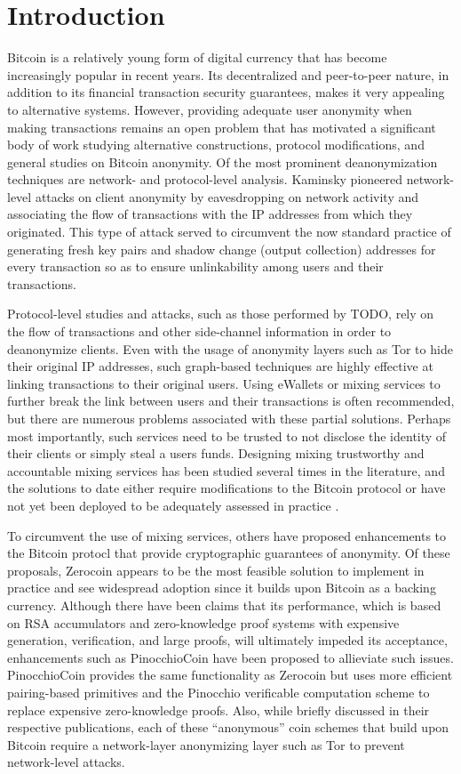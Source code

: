 \section{Introduction}
Bitcoin is a relatively young form of digital currency that has become increasingly popular in recent years. Its decentralized and peer-to-peer nature, in addition to its financial transaction security guarantees, makes it very appealing to alternative systems. However, providing adequate user anonymity when making transactions remains an open problem that has motivated a significant body of work studying alternative constructions, protocol modifications, and general studies on Bitcoin anonymity. Of the most prominent deanonymization techniques are network- and protocol-level analysis. Kaminsky \cite{kaminsky} pioneered network-level attacks on client anonymity by eavesdropping on network activity and associating the flow of transactions with the IP addresses from which they originated. This type of attack served to circumvent the now standard practice of generating fresh key pairs and shadow change (output collection) addresses for every transaction so as to ensure unlinkability among users and their transactions. 

Protocol-level studies and attacks, such as those performed by TODO, rely on the flow of transactions and other side-channel information in order to deanonymize clients. Even with the usage of anonymity layers such as Tor to hide their original IP addresses, such graph-based techniques are highly effective at linking transactions to their original users. Using eWallets or mixing services to further break the link between users and their transactions is often recommended, but there are numerous problems associated with these partial solutions. Perhaps most importantly, such services need to be trusted to not disclose the identity of their clients or simply steal a users funds. Designing mixing trustworthy and accountable mixing services has been studied several times in the literature, and the solutions to date either require modifications to the Bitcoin protocol \cite{BitterToBetter} or have not yet been deployed to be adequately assessed in practice \cite{mixcoin}.

To circumvent the use of mixing services, others have proposed enhancements to the Bitcoin protocl that provide cryptographic guarantees of anonymity. Of these proposals, Zerocoin \cite{zerocoin} appears to be the most feasible solution to implement in practice and see widespread adoption since it builds upon Bitcoin as a backing currency. Although there have been claims that its performance, which is based on RSA accumulators and zero-knowledge proof systems with expensive generation, verification, and large proofs, will ultimately impeded its acceptance, enhancements such as PinocchioCoin \cite{pinocchio} have been proposed to allieviate such issues. PinocchioCoin provides the same functionality as Zerocoin but uses more efficient pairing-based primitives and the Pinocchio verificable computation scheme to replace expensive zero-knowledge proofs. Also, while briefly discussed in their respective publications, each of these ``anonymous'' coin schemes that build upon Bitcoin require a network-layer anonymizing layer such as Tor to prevent network-level attacks.

